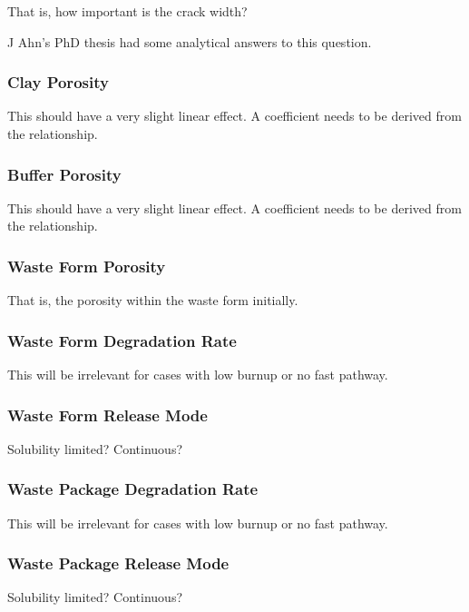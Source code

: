 That is, how important is the crack width?

J Ahn's PhD  thesis had some analytical answers to this question.

\subsubsection{Clay Porosity}

This should have a very slight linear effect. A coefficient needs to be derived 
from the relationship.

\subsubsection{Buffer Porosity}

This should have a very slight linear effect. A coefficient needs to be derived 
from the relationship.

\subsubsection{Waste Form Porosity}

That is, the porosity within the waste form initially.

\subsubsection{Waste Form Degradation Rate}

This will be irrelevant for cases with low burnup or no fast pathway. 

\subsubsection{Waste Form Release Mode}

Solubility limited? Continuous?

\subsubsection{Waste Package Degradation Rate}

This will be irrelevant for cases with low burnup or no fast pathway. 

\subsubsection{Waste Package Release Mode}

Solubility limited? Continuous?


